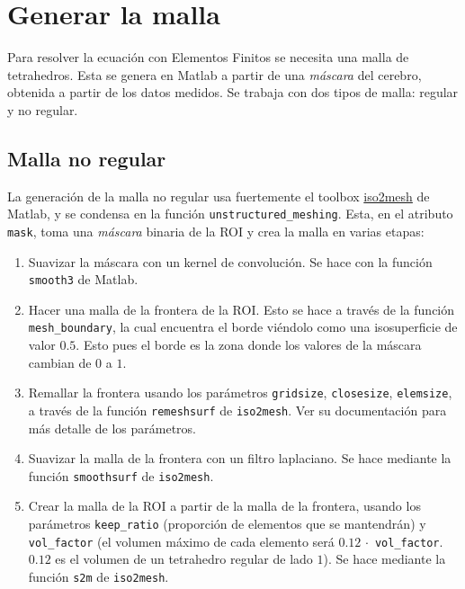 \newpage

\section{Generar la malla}

Para resolver la ecuación con Elementos Finitos se necesita una malla de tetrahedros. Esta se genera en Matlab a partir de una \textit{máscara} del cerebro, obtenida a partir de los datos medidos. Se trabaja con dos tipos de malla: regular y no regular. 


\subsection{Malla no regular}

La generación de la malla no regular usa fuertemente el toolbox \href{http://iso2mesh.sourceforge.net/cgi-bin/index.cgi}{iso2mesh} de Matlab, y se condensa en la función \texttt{unstructured\_meshing}. Esta, en el atributo \texttt{mask}, toma una \textit{máscara} binaria de la ROI y crea la malla en varias etapas:

\begin{enumerate}
    \item Suavizar la máscara con un kernel de convolución. Se hace con la función \texttt{smooth3} de Matlab.
    \item Hacer una malla de la frontera de la ROI. Esto se hace a través de la función \texttt{mesh\_boundary}, la cual encuentra el borde viéndolo como una isosuperficie de valor $0.5$. Esto pues el borde es la zona donde los valores de la máscara cambian de $0$ a $1$.
    \item Remallar la frontera usando los parámetros \texttt{gridsize}, \texttt{closesize}, \texttt{elemsize}, a través de la función \texttt{remeshsurf} de \texttt{iso2mesh}. Ver su documentación para más detalle de los parámetros.
    \item Suavizar la malla de la frontera con un filtro laplaciano. Se hace mediante la función \texttt{smoothsurf} de \texttt{iso2mesh}.
    \item Crear la malla de la ROI a partir de la malla de la frontera, usando los parámetros \texttt{keep\_ratio} (proporción de elementos que se mantendrán) y \texttt{vol\_factor} (el volumen máximo de cada elemento será $0.12 \, \cdot$ \texttt{vol\_factor}. $0.12$ es el volumen de un tetrahedro regular de lado $1$). Se hace mediante la función \texttt{s2m} de \texttt{iso2mesh}.
\end{enumerate}

